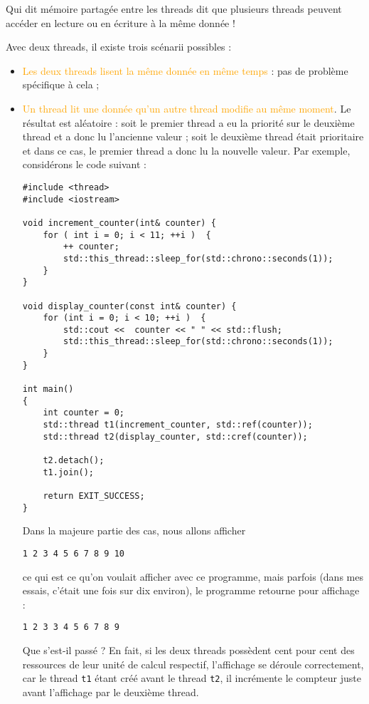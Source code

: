 \documentclass[fleqn,11pt]{article}
\begin{document}
Qui dit mémoire partagée entre les threads dit que plusieurs threads peuvent accéder
en lecture ou en écriture à la même donnée !

Avec deux threads, il existe trois scénarii possibles :
\begin{itemize}
\item \textcolor{orange}{Les deux threads lisent la même donnée en même temps} : pas de problème spécifique
à cela ;
\item \textcolor{orange}{Un thread lit une donnée qu'un autre thread modifie au même moment}.  Le résultat est aléatoire :
soit le premier thread a eu la priorité sur le deuxième thread et a donc lu l'ancienne valeur ; soit
le deuxième thread était prioritaire et dans ce cas, le premier thread a donc lu la nouvelle valeur.
Par exemple, considérons le code suivant :
\begin{lstlisting}
#include <thread>
#include <iostream>

void increment_counter(int& counter) {
    for ( int i = 0; i < 11; ++i )  {
        ++ counter;
        std::this_thread::sleep_for(std::chrono::seconds(1));
    }
}

void display_counter(const int& counter) {
    for (int i = 0; i < 10; ++i )  {
        std::cout <<  counter << " " << std::flush;
        std::this_thread::sleep_for(std::chrono::seconds(1));        
    }
}

int main()
{
    int counter = 0;
    std::thread t1(increment_counter, std::ref(counter));
    std::thread t2(display_counter, std::cref(counter));

    t2.detach();
    t1.join();

    return EXIT_SUCCESS;
}
\end{lstlisting}
Dans la majeure partie des cas, nous allons afficher 
\begin{verbatim}
1 2 3 4 5 6 7 8 9 10
\end{verbatim}
ce qui est ce qu'on voulait afficher avec ce programme,
mais parfois (dans mes essais, c'était une fois sur dix environ), le programme retourne pour affichage :
\begin{verbatim}
1 2 3 3 4 5 6 7 8 9
\end{verbatim}

Que s'est-il passé ? En fait, si les deux threads possèdent cent pour cent des ressources de leur unité de calcul respectif, l'affichage se déroule correctement, car le thread \texttt{t1} étant créé avant le thread
\texttt{t2}, il incrémente le compteur juste avant l'affichage par le deuxième thread.


\end{itemize}
\end{document}

